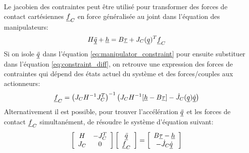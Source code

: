 Le jacobien des contraintes peut être utilisé pour transformer des forces de contact cartésiennes $\underline{f}_C$ en force généralisée au joint dans l'équation des manipulateurs:
\begin{align}
H \underline{\ddot{q}} + \underline{h} = B \underline{\tau} + J_C( \underline{ q } )^T  \underline{f}_C
\label{eq:manipulator_constraint}
\end{align}
Si on isole $\underline{\ddot{q}}$ dans l'équation \eqref{eq:manipulator_constraint} pour ensuite substituer dans l'équation \eqref{eq:constraint_diff}, on retrouve une expression des forces de contraintes qui dépend des états actuel du système et des forces/couples aux actionneurs:
\begin{align}
\underline{f}_C = \left( J_C H^{-1} J_C^T \right)^{-1} \left(  J_C H^{-1} [\underline{h} - B \underline{\tau} ] - \dot{J}_C( \underline{ q } ) \underline{\dot{q}}   \right)
\label{eq:const_forces}
\end{align}
Alternativement il est possible, pour trouver l'accélération $\underline{\ddot{q}}$ et les forces de contact $\underline{f}_C$ simultanément, de résoudre le système d'équation suivant:
\begin{align}
\left[ \begin{array}{c c } 	H & -J_C^T  \\ J_C 	& 0  	\end{array} \right] \left[ \begin{array}{c} \underline{\ddot{q}}  \\ \underline{f}_C \end{array} \right] = \left[ \begin{array}{c}  B \underline{\tau} - \underline{h}   \\ -\dot{J}_C \underline{\dot{q}}  \end{array} \right]
\label{eq:manipulator_constraint_eom}
\end{align}

